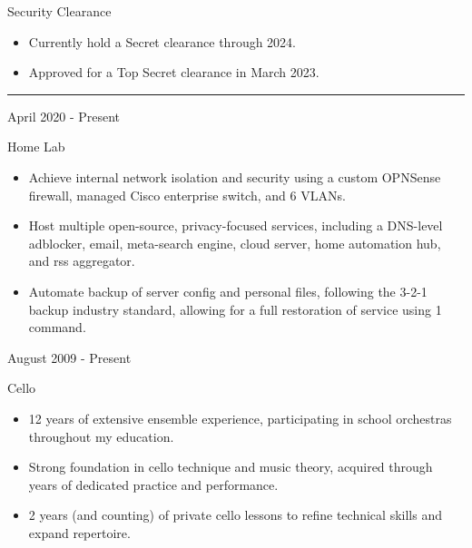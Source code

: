 \documentclass[a4paper]{article}
\newlength{\cvcolumngapwidth}
\newlength{\cvleftcolumnwidth}
\newlength{\cvrightcolumnwidth}
\newcommand{\cvsectionstyle}[1]{{\normalsize\cvsectionfont\textcolor{cvsectioncolor}{#1}}}
\newcommand{\cvtitlestyle}[1]{{\large\cvtitlefont\textcolor{cvtitlecolor}{#1}}}
\newcommand{\cvdurationstyle}[1]{{\small\cvdurationfont\textcolor{cvdurationcolor}{#1}}}
\newlength{\cvafteritemskipamount}
\newlength{\cvaftersectionskipamount}
\newlength{\cvbeforesectionskipamount}
\newlength{\cvaftertitleskipamount}
\newlength{\cvparskip}
\newcommand{\cvsection}[1]{
    \vspace{\cvbeforesectionskipamount}

    \begin{minipage}[t]{\cvleftcolumnwidth}
        \raggedleft\cvsectionstyle{#1}
    \end{minipage}%
    \hspace{\cvcolumngapwidth}%
    \begin{minipage}[t]{\cvrightcolumnwidth}
        \textcolor{cvrulecolor}{\rule{\cvrightcolumnwidth}{0.3mm}}
    \end{minipage}

    \vspace{\cvaftersectionskipamount}
}
\newcommand{\cvitem}[2]{
    \begin{minipage}[t]{\cvleftcolumnwidth}
        \raggedleft #1
    \end{minipage}%
    \hspace{\cvcolumngapwidth}%
    \begin{minipage}[t]{\cvrightcolumnwidth}
        \setlength{\parskip}{\cvparskip} #2
    \end{minipage}

    \vspace{\cvafteritemskipamount}
}
\newcommand{\cvtitle}[1]{
    \cvtitlestyle{#1}

    \vspace{\cvaftertitleskipamount}
    \vspace{-\cvparskip}
}
\begin{document}
\cvitem{
    \cvdurationstyle{Security Clearance}
}{
    \begin{itemize}[leftmargin=*]
      \item Currently hold a Secret clearance through 2024.
      \item Approved for a Top Secret clearance in March 2023.
    \end{itemize}
}


\cvsection{\LARGE \textcolor{emphasiscolor}{INTERESTS}}

\cvitem{
    \cvdurationstyle{April 2020 - Present}
}{
  \cvtitle{Home Lab}

    \begin{itemize}[leftmargin=*]
        \item Achieve internal network isolation and security using a custom OPNSense firewall, managed Cisco enterprise switch, and 6 VLANs.
        \item Host multiple open-source, privacy-focused services, including a DNS-level adblocker, email, meta-search engine, cloud server, home automation hub, and rss aggregator.
        \item Automate backup of server config and personal files, following the 3-2-1 backup industry standard, allowing for a full restoration of service using 1 command.
    \end{itemize}
}

\vspace{6mm}

\cvitem{
    \cvdurationstyle{August 2009 - Present}
}{
  \cvtitle{Cello}

    \begin{itemize}[leftmargin=*]
        \item 12 years of extensive ensemble experience, participating in school orchestras throughout my education.
        \item Strong foundation in cello technique and music theory, acquired through years of dedicated practice and performance.
        \item 2 years (and counting) of private cello lessons to refine technical skills and expand repertoire.
    \end{itemize}
}
\end{document}
